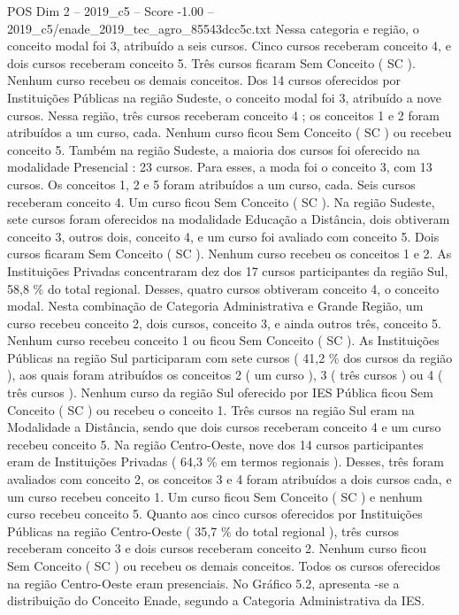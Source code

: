\begin{textsample}{POS Dim 2 – 2019\_c5 – Score -1.00 – 2019\_c5/enade\_2019\_tec\_agro\_85543dcc5c.txt}
Nessa categoria e região, o conceito modal foi 3, atribuído a seis cursos.
Cinco cursos receberam conceito 4, e dois cursos receberam conceito 5.
Três cursos ficaram Sem Conceito ( SC ).
Nenhum curso recebeu os demais conceitos.
Dos 14 cursos oferecidos por Instituições Públicas na região Sudeste, o conceito modal foi 3, atribuído a nove cursos.
Nessa região, três cursos receberam conceito 4 ; os conceitos 1 e 2 foram atribuídos a um curso, cada.
Nenhum curso ficou Sem Conceito ( SC ) ou recebeu conceito 5.
Também na região Sudeste, a maioria dos cursos foi oferecido na modalidade Presencial : 23 cursos.
Para esses, a moda foi o conceito 3, com 13 cursos.
Os conceitos 1, 2 e 5 foram atribuídos a um curso, cada.
Seis cursos receberam conceito 4.
Um curso ficou Sem Conceito ( SC ).
Na região Sudeste, sete cursos foram oferecidos na modalidade Educação a Distância, dois obtiveram conceito 3, outros dois, conceito 4, e um curso foi avaliado com conceito 5.
Dois cursos ficaram Sem Conceito ( SC ).
Nenhum curso recebeu os conceitos 1 e 2.
As Instituições Privadas concentraram dez dos 17 cursos participantes da região Sul, 58,8 \% do total regional.
Desses, quatro cursos obtiveram conceito 4, o conceito modal.
Nesta combinação de Categoria Administrativa e Grande Região, um curso recebeu conceito 2, dois cursos, conceito 3, e ainda outros três, conceito 5.
Nenhum curso recebeu conceito 1 ou ficou Sem Conceito ( SC ).
As Instituições Públicas na região Sul participaram com sete cursos ( 41,2 \% dos cursos da região ), aos quais foram atribuídos os conceitos 2 ( um curso ), 3 ( três cursos ) ou 4 ( três cursos ).
Nenhum curso da região Sul oferecido por IES Pública ficou Sem Conceito ( SC ) ou recebeu o conceito 1.
Três cursos na região Sul eram na Modalidade a Distância, sendo que dois cursos receberam conceito 4 e um curso recebeu conceito 5.
Na região Centro-Oeste, nove dos 14 cursos participantes eram de Instituições Privadas ( 64,3 \% em termos regionais ).
Desses, três foram avaliados com conceito 2, os conceitos 3 e 4 foram atribuídos a dois cursos cada, e um curso recebeu conceito 1.
Um curso ficou Sem Conceito ( SC ) e nenhum curso recebeu conceito 5.
Quanto aos cinco cursos oferecidos por Instituições Públicas na região Centro-Oeste ( 35,7 \% do total regional ), três cursos receberam conceito 3 e dois cursos receberam conceito 2.
Nenhum curso ficou Sem Conceito ( SC ) ou recebeu os demais conceitos.
Todos os cursos oferecidos na região Centro-Oeste eram presenciais.
No Gráfico 5.2, apresenta -se a distribuição do Conceito Enade, segundo a Categoria Administrativa da IES.

\end{textsample}
